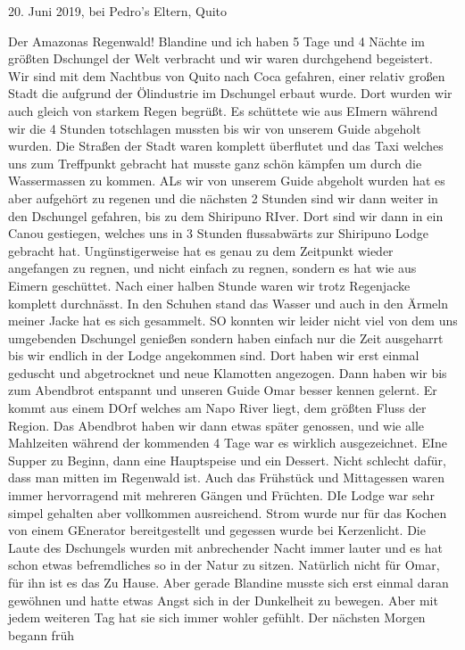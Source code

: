 \documentclass[11pt]{book}
\begin{document}
20. Juni 2019, bei Pedro's Eltern, Quito

Der Amazonas Regenwald! Blandine und ich haben 5 Tage und 4 Nächte im größten Dschungel der Welt verbracht und wir waren durchgehend begeistert. 
Wir sind mit dem Nachtbus von Quito nach Coca gefahren, einer relativ großen Stadt die aufgrund der Ölindustrie im Dschungel erbaut wurde. Dort 
wurden wir auch gleich von starkem Regen begrüßt. Es schüttete wie aus EImern während wir die 4 Stunden totschlagen mussten bis wir von unserem Guide 
abgeholt wurden. Die Straßen der Stadt waren komplett überflutet und das Taxi welches uns zum Treffpunkt gebracht hat musste ganz schön kämpfen um 
durch die Wassermassen zu kommen. ALs wir von unserem Guide abgeholt wurden hat es aber aufgehört zu regenen und die nächsten 2 Stunden sind wir dann 
weiter in den Dschungel gefahren, bis zu dem Shiripuno RIver. Dort sind wir dann in ein Canou gestiegen, welches uns in 3 Stunden flussabwärts zur 
Shiripuno Lodge gebracht hat. Ungünstigerweise hat es genau zu dem Zeitpunkt wieder angefangen zu regnen, und nicht einfach zu regnen, sondern es hat 
wie aus Eimern geschüttet. Nach einer halben Stunde waren wir trotz Regenjacke komplett durchnässt. In den Schuhen stand das Wasser und auch in den 
Ärmeln meiner Jacke hat es sich gesammelt. SO konnten wir leider nicht viel von dem uns umgebenden Dschungel genießen sondern haben einfach nur die Zeit 
ausgeharrt bis wir endlich in der Lodge angekommen sind. Dort haben wir erst einmal geduscht und abgetrocknet und neue Klamotten angezogen. Dann haben 
wir bis zum Abendbrot entspannt und unseren Guide Omar besser kennen gelernt. Er kommt aus einem DOrf welches am Napo River liegt, dem größten Fluss der 
Region. Das Abendbrot haben wir dann etwas später genossen, und wie alle Mahlzeiten während der kommenden 4 Tage war es wirklich ausgezeichnet. EIne 
Supper zu Beginn, dann eine Hauptspeise und ein Dessert. Nicht schlecht dafür, dass man mitten im Regenwald ist. Auch das Frühstück und Mittagessen waren 
immer hervorragend mit mehreren Gängen und Früchten. DIe Lodge war sehr simpel gehalten aber vollkommen ausreichend. Strom wurde nur für das Kochen von einem 
GEnerator bereitgestellt und gegessen wurde bei Kerzenlicht. Die Laute des Dschungels wurden mit anbrechender Nacht immer lauter und es hat schon etwas 
befremdliches so in der Natur zu sitzen. Natürlich nicht für Omar, für ihn ist es das Zu Hause. Aber gerade Blandine musste sich erst einmal daran gewöhnen 
und hatte etwas Angst sich in der Dunkelheit zu bewegen. Aber mit jedem weiteren Tag hat sie sich immer wohler gefühlt. Der nächsten Morgen begann früh 
\end{document}
